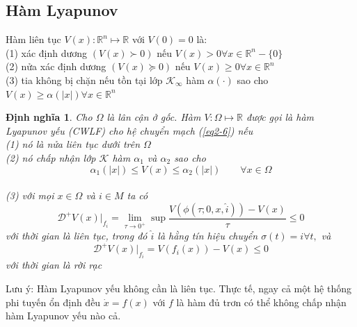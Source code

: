 \documentclass[14pt,a4paper,oneside]{report}		%
\newtheorem{define}[theorem]{Định nghĩa}
\begin{document}
\subsection{Hàm Lyapunov}
Hàm liên tục $V(x): \mathbb{R}^n\mapsto \mathbb{R}$ với $V(0)=0$ là:\\
(1) xác định dương $(V(x)\succ 0)$ nếu $V(x)>0\forall x\in\mathbb{R}^n-\{0\}$ \\
(2) nửa xác định dương $(V(x)\succeq 0)$ nếu $V(x)\geq 0\forall x\in\mathbb{R}^n$ \\
(3) tia không bị chặn nếu tồn tại lớp $\mathcal{K}_\infty$ hàm $\alpha (\cdot)$ sao cho $V(x)\geq \alpha(|x|)\forall x\in\mathbb{R}^n$ \\

\begin{define} \label{def2-2}
Cho $\Omega$ là lân cận ở gốc. Hàm $V:\Omega \mapsto\mathbb{R}$ được gọi là hàm Lyapunov yếu (CWLF) cho hệ chuyển mạch (\ref{eq2-6}) nếu \\
(1) nó là nửa liên tục dưới trên $\Omega$\\
(2) nó chấp nhận lớp $\mathcal{K}$ hàm $\alpha_1$ và $\alpha_2$ sao cho
$$\alpha_1(|x|)\leq V(x)\leq \alpha_2(|x|)\qquad \forall x\in\Omega$$\\
(3) với mọi $x\in\Omega$ và $i\in M$ ta có
$$\mathcal{D}^+V(x)|_{f_i} = \lim_{\tau \rightarrow 0^+}\sup\frac{V(\phi(\tau;0,x,\widehat{i}))-V(x)}{\tau}\leq 0$$
với thời gian là liên tục, trong đó $\widehat{i}$ là hằng tín hiệu chuyển $\sigma(t)=i \forall t,$ và
$$\mathcal{D}^+V(x)|_{f_i}=V(f_i(x))-V(x)\leq 0$$
với thời gian là rời rạc
\end{define}

Lưu ý: Hàm Lyapunov yếu không cần là liên tục. Thực tế, ngay cả một hệ thống phi tuyến ổn định đều $\dot{x}=f(x)$ với $f$ là hàm đủ trơn có thể không chấp nhận hàm Lyapunov yếu nào cả.
\end{document}
